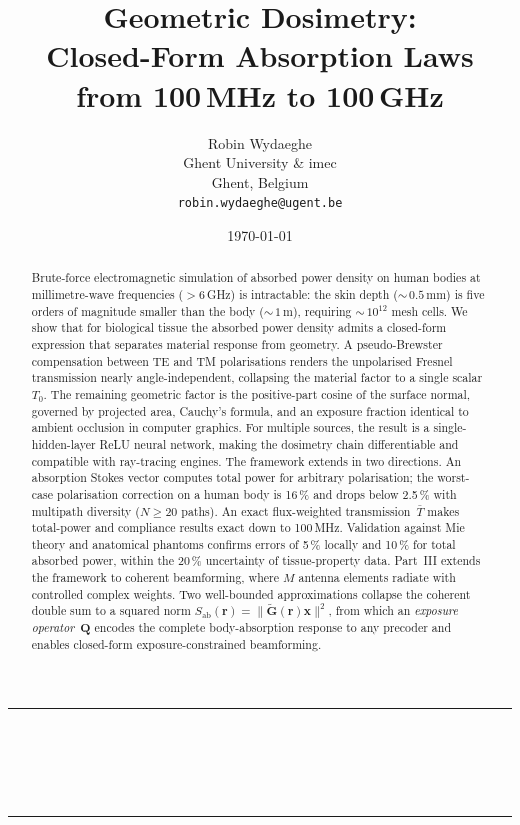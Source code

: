 \documentclass[11pt,a4paper]{article}
\title{\textbf{Geometric Dosimetry:\\[0.3em]
Closed-Form Absorption Laws \\
from 100\,MHz to 100\,GHz}}
\author{
  Robin Wydaeghe \\
  Ghent University \& imec \\
  Ghent, Belgium \\
  \normalfont\texttt{robin.wydaeghe@ugent.be}
}
\date{\today}
\makeatletter
\theoremstyle{definition}      %
\renewcommand{\maketitle}{%
  \thispagestyle{plain}%
  \begin{center}
    \rule{\linewidth}{1pt}\\[0.4em]
    {\LARGE\bfseries \@title}\\[0.5em]
    {\large \@author}\\[0.3em]
    {\small \@date}
    \\[0.4em]\rule{\linewidth}{1pt}
  \end{center}
  \vspace{0.5em}
}
\makeatother
\begin{document}
\maketitle

\begin{abstract}
Brute-force electromagnetic simulation of absorbed power density on
human bodies at millimetre-wave frequencies ($>6$\,GHz) is intractable:
the skin depth (${\sim}\,0.5$\,mm) is five orders of magnitude smaller
than the body (${\sim}\,1$\,m), requiring ${\sim}\,10^{12}$ mesh cells.
We show that for biological tissue the absorbed power density admits a
closed-form expression that separates material response from geometry.
A pseudo-Brewster compensation between TE and TM polarisations
renders the unpolarised Fresnel transmission nearly angle-independent,
collapsing the material factor to a single scalar~$T_0$.  The
remaining geometric factor is the positive-part cosine of the surface
normal, governed by projected area, Cauchy's formula, and an
exposure fraction identical to ambient occlusion in computer graphics.
For multiple sources, the result is a single-hidden-layer ReLU neural
network, making the dosimetry chain differentiable and compatible with
ray-tracing engines.
%
The framework extends in two directions.  An absorption Stokes
vector computes total power for arbitrary polarisation; the
worst-case polarisation correction on a human body is 16\,\% and
drops below 2.5\,\% with multipath diversity ($N\ge 20$ paths).
An exact flux-weighted transmission~$\bar{T}$ makes total-power and
compliance results exact down to 100\,MHz.  Validation against Mie
theory and anatomical phantoms confirms errors of 5\,\% locally and
10\,\% for total absorbed power, within the 20\,\% uncertainty of
tissue-property data.
%
Part~III extends the framework to coherent beamforming, where $M$
antenna elements radiate with controlled complex weights.  Two
well-bounded approximations collapse the coherent double sum to a
squared norm $S_{\mathrm{ab}}(\mathbf{r}) =
\|\tilde{\mathbf{G}}(\mathbf{r})\mathbf{x}\|^2$, from which an
\emph{exposure operator}~$\mathbf{Q}$ encodes the complete
body-absorption response to any precoder and enables closed-form
exposure-constrained beamforming.
\end{abstract}
\end{document}
